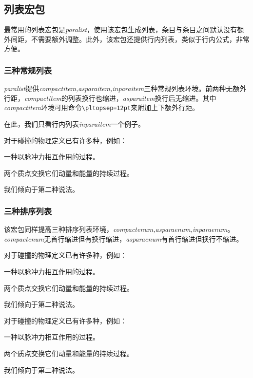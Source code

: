 \subsection{列表宏包}
最常用的列表宏包是\emph{paralist}，使用该宏包生成列表，条目与条目之间默认没有额外间距，不需要额外调整。此外，该宏包还提供行内列表，类似于行内公式，非常方便。

\subsubsection{三种常规列表}
\emph{paralist}提供\emph{compactitem,asparaitem,inparaitem}三种常规列表环境。前两种无额外行距，\emph{compactitem}的列表换行也缩进，\emph{asparaitem}换行后无缩进。其中\emph{compactitem}环境可用命令\verb|\pltopsep=12pt|来附加上下额外行距。

在此，我们只看行内列表\emph{inparaitem}一个例子。

\begin{codeshow}
	对于碰撞的物理定义已有许多种，例如：
	\begin{inparaitem}[\S]
		\item 一种以脉冲力相互作用的过程。
		\item 两个质点交换它们动量和能量的持续过程。
	\end{inparaitem}
	我们倾向于第二种说法。
\end{codeshow}

\subsubsection{三种排序列表}
该宏包同样提高三种排序列表环境，\emph{compactenum,asparaenum,inparaenum}。\emph{compactenum}无首行缩进但有换行缩进，\emph{asparaenum}有首行缩进但换行不缩进。

\begin{codeshow}
	对于碰撞的物理定义已有许多种，例如：
	\begin{compactenum}[(1)]
		\item 一种以脉冲力相互作用的过程。
		\item 两个质点交换它们动量和能量的持续过程。
	\end{compactenum}
	我们倾向于第二种说法。
\end{codeshow}

\begin{codeshow}
	对于碰撞的物理定义已有许多种，例如：
	\begin{asparaenum}[(1)]
		\item 一种以脉冲力相互作用的过程。
		\item 两个质点交换它们动量和能量的持续过程。
	\end{asparaenum}
	我们倾向于第二种说法。
\end{codeshow}

